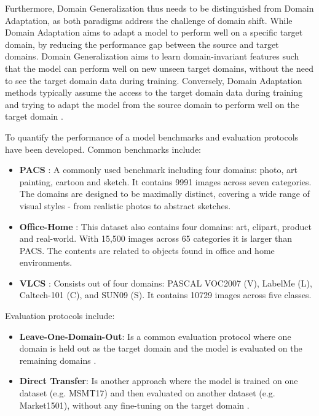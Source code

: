 Furthermore, Domain Generalization thus needs to be distinguished from Domain Adaptation, as both paradigms address the challenge of domain shift. While Domain Adaptation aims to adapt a model to perform well on a specific target domain, by reducing the performance gap between the source and target domains. Domain Generalization aims to learn domain-invariant features such that the model can perform well on new unseen target domains, without the need to see the target domain data during training. Conversely, Domain Adaptation methods typically assume the access to the target domain data during training and trying to adapt the model from the source domain to perform well on the target domain \citep{liDeeperBroaderArtier2017,liuDEJAVUContinual2023, wangDeepVisualDomain2018}. 

To quantify the performance of a model benchmarks and evaluation protocols have been developed. Common benchmarks include:
\begin{itemize}
    \item \textbf{PACS} \citep{liDeeperBroaderArtier2017}: A commonly used benchmark including four domains: photo, art painting, cartoon and sketch. It contains 9991 images across seven categories. The domains are designed to be maximally distinct, covering a wide range of visual styles - from realistic photos to abstract sketches.
    \item \textbf{Office-Home} \citep{venkateswaraDeepHashingNetwork2017}: This dataset also contains four domains: art, clipart, product and real-world. With 15,500 images across 65 categories it is larger than PACS. The contents are related to objects found in office and home environments.
    \item \textbf{VLCS} \citep{fangUnbiasedMetricLearning2013}: Consists out of four domains: PASCAL VOC2007 (V), LabelMe (L), Caltech-101 (C), and SUN09 (S). It contains 10729 images across five classes.

\end{itemize}
Evaluation protocols include:
\begin{itemize}
    \item \textbf{Leave-One-Domain-Out}: Is a common evaluation protocol where one domain is held out as the target domain and the model is evaluated on the remaining domains \citep{liDeeperBroaderArtier2017}.
    \item \textbf{Direct Transfer}: Is another approach where the model is trained on one dataset (e.g. MSMT17) and then evaluated on another dataset (e.g. Market1501), without any fine-tuning on the target domain \citep{chongLearningDomainInvariant2021}.
\end{itemize}

